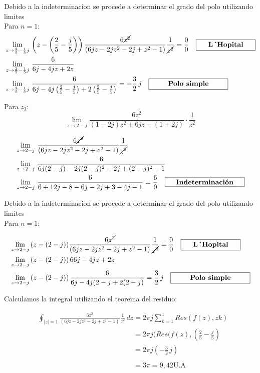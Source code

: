 \documentclass[12pt,a4paper]{report}
\begin{document}
Debido a la indeterminacion se procede a determinar el grado del polo utilizando limites\\[8pt]
Para $n=1$:
\begin{align*}
&\lim_{z \to \frac{2}{5}-\frac{1}{5}j}\,\left(z-\left( \frac{2}{5}-\frac{j}{5} \right)\right)\frac{6\cancel{z^2}}{(6jz-2jz^2-2j+z^2-1)}\frac{1}{\cancel{z^2}}=\frac{0}{0} \quad \framebox[3cm][c]{\textbf{L´Hopital}}\\
&\lim_{z \to \frac{2}{5}-\frac{1}{5}j}\,\frac{6}{6j-4jz+2z}\\
&\lim_{z \to \frac{2}{5}-\frac{1}{5}j}\,\frac{6}{6j-4j\left(\frac{2}{5}-\frac{j}{5} \right) +2 \left(\frac{2}{5}-\frac{j}{5} \right)}= -\frac{3}{2}\, j \quad \framebox[4cm][c]{\textbf{Polo simple}}\\
\end{align*}


Para $z_3$:
$$\lim_{z \to 2-j}\frac{6z^2}{(1- 2j)z^{2} + 6jz - (1 + 2j)} \cdot \frac{1}{z^2}
$$

\begin{align*}
&\lim_{z \to 2-j}\,\frac{6\cancel{z^2}}{(6jz-2jz^2-2j+z^2-1)}\frac{1}{\cancel{z^2}}\\
&\lim_{z \to 2-j}\, \frac{6}{6j(2-j)-2j(2-j)^2-2j+(2-j)^2-1}\\
&\lim_{z \to 2-j}\,\frac{6}{6+12j-8-6j-2j+3-4j-1}= \frac{6}{0} \quad \framebox[4cm][c]{\textbf{Indeterminación}}\\
\end{align*}

Debido a la indeterminacion se procede a determinar el grado del polo utilizando limites\\[8pt]
Para $n=1$:

\begin{align*}
&\lim_{z \to 2-j}\,(z-(2-j))\frac{6\cancel{z^2}}{(6jz-2jz^2-2j+z^2-1)}\frac{1}{\cancel{z^2}}=\frac{0}{0}\quad \framebox[3cm][c]{\textbf{L´Hopital}}\\
&\lim_{z \to 2-j}\,(z-(2-j))\, {6}{6j-4jz+2z}\\
&\lim_{z \to 2-j}\,(z-(2-j))\, \frac{6}{6j-4j(2-j+2(2-j)}=\frac{3}{2} \, j \quad \framebox[4cm][c]{\textbf{Polo simple}}\\
\end{align*}

Calculamos la integral utilizando el teorema del residuo:

\begin{align*}
& \oint_{|z|=1} \frac{6z^2}{(6jz-2jz^2-2j+z^2-1)}\frac{1}{z^2}\, dz= 2\pi j \sum_{k=1}^1 Res(f(z),zk)\\
&\phantom{\oint_{|z|=1} \frac{6z^2}{(6jz-2jz^2-2j+z^2-1)}\frac{1}{z^2}\, dz}=2\pi j (Res(f(z),\left( \frac{2}{5}-\frac{j}{5} \right)\\
&\phantom{\oint_{|z|=1} \frac{6z^2}{(6jz-2jz^2-2j+z^2-1)}\frac{1}{z^2}\, dz}=2\pi j \left( -\frac{3}{2}\,j \right)\\
&\phantom{\oint_{|z|=1} \frac{6z^2}{(6jz-2jz^2-2j+z^2-1)}\frac{1}{z^2}\, dz}=3\pi = 9,42 \text{U.A}\\
\end{align*}
\end{document}
